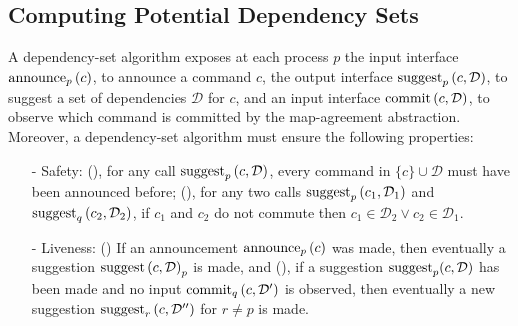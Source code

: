 

\subsection{Computing Potential Dependency Sets}
\label{dep-algo}

A dependency-set algorithm exposes at each process $p$ the input interface $\operatorname{announce}_p\left( c \right)$, to announce a command $c$, the output interface $\operatorname{suggest}_p \left( c,\mathcal{D}\right)$, to suggest a set of dependencies $\mathcal{D}$ for $c$, and an input interface $\operatorname{commit}\left( c,\mathcal{D} \right)$,  to observe which command is committed by the map-agreement abstraction.
Moreover, a dependency-set algorithm must ensure the following properties:
\begin{itemize}[noitemsep,nolistsep]
    \item[-] Safety: (), for any call $\operatorname{suggest}_p \left( c,\mathcal{D}\right)$, every command in $\{c\}\cup \mathcal{D}$ must have been announced before; (), for any two calls $\operatorname{suggest}_p \left( c_1,\mathcal{D}_1\right)$ and $\operatorname{suggest}_q \left( c_2,\mathcal{D}_2\right)$, if $c_1$ and $c_2$ do not commute then $c_1\in \mathcal{D}_2\vee c_2 \in \mathcal{D}_1$.
    \item[-] Liveness: () If an announcement $\operatorname{announce}_p\left( c \right)$ was made, then eventually a suggestion $\operatorname{suggest}\left( c,\mathcal{D} \right)_p$ is made, and (), if a suggestion $\operatorname{suggest}_p(c,\mathcal{D})$ has been made and no input $\operatorname{commit}_q\left( c,\mathcal{D'} \right)$ is observed, then eventually a new suggestion $\operatorname{suggest}_r\left( c,\mathcal{D''} \right)$ for $r\neq p$ is made.
\end{itemize}

